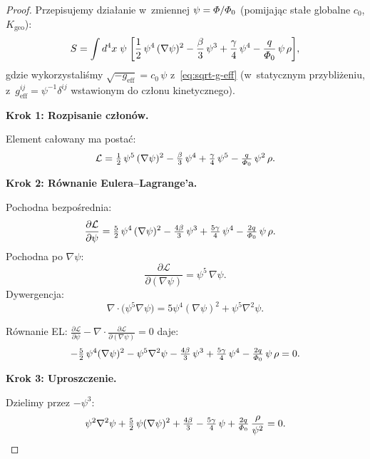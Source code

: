 \begin{proof}
Przepisujemy dzia\l{}anie w~zmiennej $\psi = \varPhi/\varPhi_0$
(pomijaj\k{a}c sta\l{}e globalne $c_0$, $K_{\mathrm{geo}}$):
\begin{equation}\label{eq:S-unified-psi}
  S = \int d^4x\;\psi\;\biggl[
    \frac{1}{2}\,\psi^4\,(\nabla\psi)^2
    - \frac{\beta}{3}\,\psi^3 + \frac{\gamma}{4}\,\psi^4
    - \frac{q}{\varPhi_0}\,\psi\,\rho
  \biggr],
\end{equation}
gdzie wykorzystali\'smy $\sqrt{-g_{\mathrm{eff}}} = c_0\,\psi$
z~\eqref{eq:sqrt-g-eff} (w~statycznym przybli\.zeniu,
z~$g_{\mathrm{eff}}^{ij} = \psi^{-1}\delta^{ij}$
wstawionym do cz\l{}onu kinetycznego).

\medskip\noindent\textbf{Krok 1: Rozpisanie cz\l{}on\'ow.}

Element ca\l{}owany ma posta\'c:
\[
  \mathcal{L}
  = \tfrac{1}{2}\,\psi^5\,(\nabla\psi)^2
  - \tfrac{\beta}{3}\,\psi^4
  + \tfrac{\gamma}{4}\,\psi^5
  - \tfrac{q}{\varPhi_0}\,\psi^2\,\rho.
\]

\medskip\noindent\textbf{Krok 2: R\'ownanie Eulera--Lagrange'a.}

Pochodna bezpo\'srednia:
\begin{align}
  \frac{\partial\mathcal{L}}{\partial\psi}
  &= \tfrac{5}{2}\,\psi^4\,(\nabla\psi)^2
  - \tfrac{4\beta}{3}\,\psi^3
  + \tfrac{5\gamma}{4}\,\psi^4
  - \tfrac{2q}{\varPhi_0}\,\psi\,\rho.
\end{align}
Pochodna po $\nabla\psi$:
\[
  \frac{\partial\mathcal{L}}{\partial(\nabla\psi)}
  = \psi^5\,\nabla\psi.
\]
Dywergencja:
\[
  \nabla\!\cdot\!\bigl(\psi^5\nabla\psi\bigr)
  = 5\psi^4(\nabla\psi)^2 + \psi^5\nabla^2\psi.
\]

R\'ownanie EL:
$\frac{\partial\mathcal{L}}{\partial\psi}
- \nabla\!\cdot\!\frac{\partial\mathcal{L}}{\partial(\nabla\psi)} = 0$
daje:
\begin{equation}\label{eq:EL-unified-raw}
  -\tfrac{5}{2}\,\psi^4(\nabla\psi)^2
  - \psi^5\nabla^2\psi
  - \tfrac{4\beta}{3}\,\psi^3
  + \tfrac{5\gamma}{4}\,\psi^4
  - \tfrac{2q}{\varPhi_0}\,\psi\,\rho
  = 0.
\end{equation}

\medskip\noindent\textbf{Krok 3: Uproszczenie.}

Dzielimy przez $-\psi^3$:
\begin{equation}\label{eq:EL-unified-divided}
  \psi^2\nabla^2\psi
  + \tfrac{5}{2}\,\psi(\nabla\psi)^2
  + \tfrac{4\beta}{3}
  - \tfrac{5\gamma}{4}\,\psi
  + \tfrac{2q}{\varPhi_0}\,\frac{\rho}{\psi^2}
  = 0.
\end{equation}


\end{proof}
